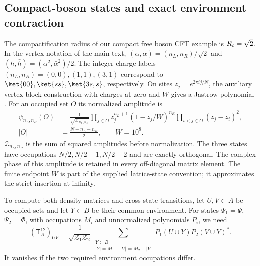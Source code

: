 \documentclass[11pt]{article}
\begin{document}
\subsection{Compact-boson states and exact environment contraction}
\label{app:num-boson}
The compactification radius of our compact free boson CFT example is $R_{\rm c}=\sqrt2$. In the vertex notation of
the main text, $(\alpha,\bar\alpha)=(n_L,n_R)/\sqrt2$ and
$(h,\bar h)=(\alpha^2,\bar\alpha^2)/2$.
The integer charge labels $(n_L,n_R)=(0,0),(1,1),(3,1)$ correspond
to $\ket{00},\ket{ss},\ket{3s,s}$, respectively. On sites
$z_j=e^{2\pi i j/N}$, the auxiliary vertex-block construction
with charges at zero and $W$ gives a Jastrow polynomial
\cite{numHerwerth}. For an occupied set $O$ its normalized
amplitude is
\begin{align}
 \psi_{n_L,n_R}(O)&=\frac{1}{\sqrt{\mathcal Z_{n_L,n_R}}}
 \prod_{j\in O}z_j^{n_L+1}(1-z_j/W)^{n_R}
 \prod_{i<j\in O}(z_j-z_i)^2,\nonumber\\
 |O|&=\frac{N-n_L-n_R}{2},\qquad W=10^8.
 \label{eq:num-boson-wavefunction}
\end{align}
$\mathcal Z_{n_L,n_R}$ is the sum of squared amplitudes before
normalization. The three states have occupations $N/2,N/2-1,N/2-2$
and are exactly orthogonal. The complex phase of this amplitude is retained in every off-diagonal matrix element. The finite endpoint $W$ is part of the supplied lattice-state convention; it approximates the strict insertion at infinity.

To compute both density matrices and cross-state transitions,
let $U,V\subset A$ be occupied sets and let $Y\subset B$ be
their common environment. For states $\Psi_1=\Psi$, $\Psi_2=\Phi$, with occupations
$M_i$ and unnormalized polynomials $P_i$, we need
\begin{equation}
 (\mathsf T_A^{12})_{UV}=\frac{1}{\sqrt{\mathcal Z_1\mathcal Z_2}}
 \sum_{\substack{Y\subset B\\|Y|=M_1-|U|=M_2-|V|}}
       P_1(U\cup Y)P_2(V\cup Y)^*.
 \label{eq:num-boson-transition}
\end{equation}
It vanishes if the two required environment occupations differ.
\end{document}
